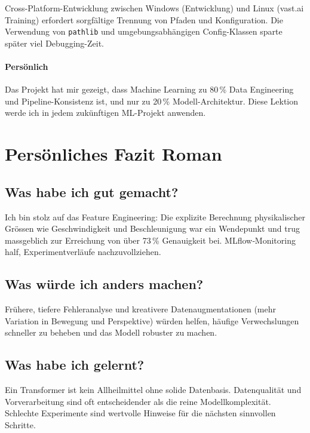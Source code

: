 Cross-Platform-Entwicklung zwischen Windows (Entwicklung) und Linux (vast.ai Training) erfordert sorgfältige Trennung von Pfaden und Konfiguration. Die Verwendung von \texttt{pathlib} und umgebungsabhängigen Config-Klassen sparte später viel Debugging-Zeit.

\paragraph{Persönlich}
Das Projekt hat mir gezeigt, dass Machine Learning zu 80\,\% Data Engineering und Pipeline-Konsistenz ist, und nur zu 20\,\% Modell-Architektur. Diese Lektion werde ich in jedem zukünftigen ML-Projekt anwenden.

\section{Persönliches Fazit Roman}
\label{sec:personal_conclusion_roman}

\subsection{Was habe ich gut gemacht?}
Ich bin stolz auf das Feature Engineering: Die explizite Berechnung physikalischer Grössen wie Geschwindigkeit und Beschleunigung war ein Wendepunkt und trug massgeblich zur Erreichung von über 73\,\% Genauigkeit bei. MLflow‑Monitoring half, Experimentverläufe nachzuvollziehen.

\subsection{Was würde ich anders machen?}
Frühere, tiefere Fehleranalyse und kreativere Datenaugmentationen (mehr Variation in Bewegung und Perspektive) würden helfen, häufige Verwechslungen schneller zu beheben und das Modell robuster zu machen.

\subsection{Was habe ich gelernt?}
Ein Transformer ist kein Allheilmittel ohne solide Datenbasis. Datenqualität und Vorverarbeitung sind oft entscheidender als die reine Modellkomplexität. Schlechte Experimente sind wertvolle Hinweise für die nächsten sinnvollen Schritte.